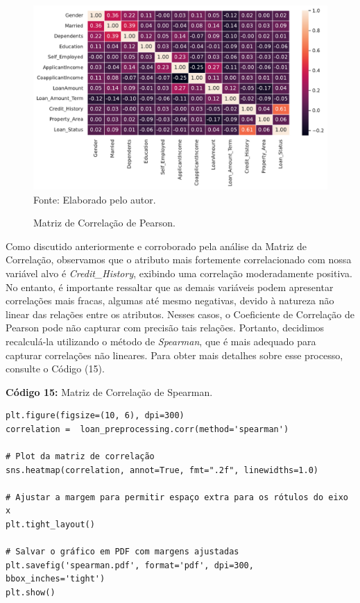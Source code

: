 \documentclass[a4paper,12pt]{article} %
\begin{document}
\begin{figure}[H]
    \centering
    \caption{Matriz de Correlação de Pearson.}
    \includegraphics[scale=0.65]{Figures/pearson.pdf} \\
    Fonte: Elaborado pelo autor.
    \label{fig:4}
\end{figure}

Como discutido anteriormente e corroborado pela análise da Matriz de Correlação, observamos que o atributo mais fortemente correlacionado com nossa variável alvo é \textit{Credit\_History}, exibindo uma correlação moderadamente positiva. No entanto, é importante ressaltar que as demais variáveis podem apresentar correlações mais fracas, algumas até mesmo negativas, devido à natureza não linear das relações entre os atributos. Nesses casos, o Coeficiente de Correlação de Pearson pode não capturar com precisão tais relações. Portanto, decidimos recalculá-la utilizando o método de \textit{Spearman}, que é mais adequado para capturar correlações não lineares. Para obter mais detalhes sobre esse processo, consulte o Código (15).

\begin{center}
\textbf{Código 15:} Matriz de Correlação de Spearman.
\begin{verbatim}
plt.figure(figsize=(10, 6), dpi=300)
correlation =  loan_preprocessing.corr(method='spearman')

# Plot da matriz de correlação
sns.heatmap(correlation, annot=True, fmt=".2f", linewidths=1.0)

# Ajustar a margem para permitir espaço extra para os rótulos do eixo x
plt.tight_layout()

# Salvar o gráfico em PDF com margens ajustadas
plt.savefig('spearman.pdf', format='pdf', dpi=300, bbox_inches='tight')
plt.show()
\end{verbatim}
\end{center}
\end{document}
